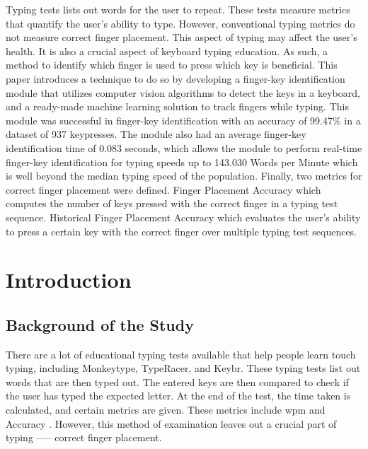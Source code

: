 \documentclass{report}
\begin{document}
Typing tests lists out words for the user to repeat. These tests measure metrics
that quantify the user's ability to type. However, conventional typing metrics
do not measure correct finger placement. This aspect of typing may affect the
user's health. It is also a crucial aspect of keyboard typing education. As
such, a method to identify which finger is used to press which key is
beneficial. This paper introduces a technique to do so by developing a
finger-key identification module that utilizes computer vision algorithms to
detect the keys in a keyboard, and a ready-made machine learning solution to
track fingers while typing. This module was successful in finger-key
identification with an accuracy of 99.47\% in a dataset of 937 keypresses. The
module also had an average finger-key identification time of 0.083 seconds,
which allows the module to perform real-time finger-key identification for
typing speeds up to 143.030 Words per Minute which is well beyond the median
typing speed of the population. Finally, two metrics for correct finger
placement were defined. Finger Placement Accuracy which computes the number of
keys pressed with the correct finger in a typing test sequence. Historical
Finger Placement Accuracy which evaluates the user's ability to press a certain
key with the correct finger over multiple typing test sequences.


\newpage

\printacronyms{}
\newpage

\listoftables
\newpage

\listoffigures
\newpage

\listofequations

\newpage

\tableofcontents
\newpage


\chapter{Introduction}


\section{Background of the Study}
There are a lot of educational typing tests available that help people learn
touch typing, including Monkeytype, TypeRacer, and Keybr. These typing tests
list out words that are then typed out. The entered keys are then compared to
check if the user has typed the expected letter. At the end of the test, the
time taken is calculated, and certain metrics are given. These metrics include
\ac{wpm} and Accuracy \parencite{arif2009}. However, this method of examination
leaves out a crucial part of typing --— correct finger placement.
\end{document}
